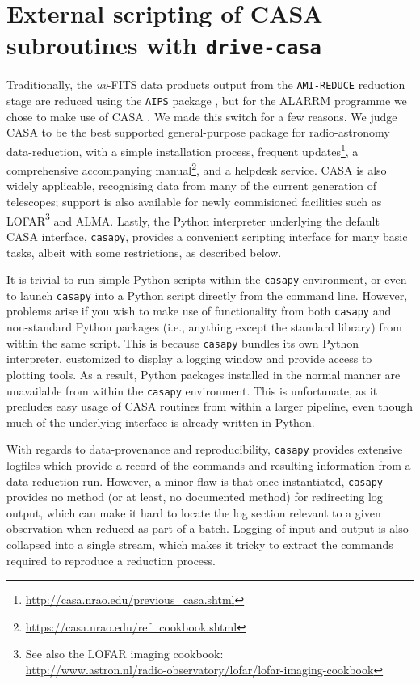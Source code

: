 \documentclass[5p,authoryear]{elsarticle}
\begin{document}
\section{External scripting of CASA subroutines with \texttt{drive-casa}}
\label{sec:drive-casa}
Traditionally, the \textit{uv}-FITS data products output from the \texttt{AMI-REDUCE} reduction stage are reduced using the \texttt{AIPS} package \citep{Fomalont1981}, but for the ALARRM programme we chose to make use of CASA \citep{McMullin2007}. 
We made this switch for a few reasons.
We judge CASA to be the best supported general-purpose package for radio-astronomy data-reduction, 
with a simple installation process, 
frequent updates\footnote{\url{http://casa.nrao.edu/previous_casa.shtml}}, 
a comprehensive accompanying 
manual\footnote{\url{https://casa.nrao.edu/ref_cookbook.shtml}},
and a helpdesk service. 
CASA is also widely applicable, recognising data from many of the current generation of telescopes; support is also available for newly commisioned facilities such as 
LOFAR\footnote{%
See also the LOFAR imaging cookbook:\\ 
\url{http://www.astron.nl/radio-observatory/lofar/lofar-imaging-cookbook}
}
and ALMA. 
Lastly, the Python interpreter underlying the default CASA interface, \texttt{casapy}, provides a convenient scripting interface for many basic tasks, albeit with some restrictions, as described below.

It is trivial to run simple Python scripts within the \texttt{casapy} environment, or even to launch \texttt{casapy} into a Python script directly from the command line. 
However, problems arise if you wish to make use of functionality from both \texttt{casapy} and non-standard Python packages (i.e., anything except the standard library) from within the same script.
This is because \texttt{casapy} bundles its own Python interpreter, customized to display a logging window and provide access to plotting tools. 
As a result, Python packages installed in the normal manner are unavailable from within the \texttt{casapy} environment. 
This is unfortunate, as it precludes easy usage of CASA routines from within a larger pipeline, even though much of the underlying interface is already written in Python.

With regards to data-provenance and reproducibility, \texttt{casapy} provides extensive logfiles which provide a record of the commands and resulting information from a data-reduction run. 
However, a minor flaw is that once instantiated, \texttt{casapy} provides no method (or at least, no documented method) for redirecting log output, which can make it hard to locate the log section relevant to a given observation when reduced as part of a batch. 
Logging of input and output is also collapsed into a single stream, which makes it tricky to extract the commands required to reproduce a reduction process.
\end{document}
